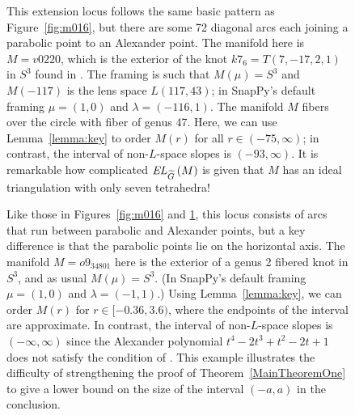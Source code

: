 \documentclass[tikz, sepfignums, defaultenums]{nmd/article}
\newcommand{\TEL}[1]{\mathit{EL}_\Gtil\left(#1\right)}
\begin{document}
\begin{figure}
  \begin{center}
  \end{center}

  \caption{ This extension locus follows the same basic pattern as
    Figure~\ref{fig:m016}, but there are some 72 diagonal arcs each
    joining a parabolic point to an Alexander point.  The manifold
    here is $M = v0220$, which is the exterior of the knot
    $k7_6 = T(7,-17,2,1)$ in $S^3$ found in
    \cite{ChampanerkarKofmanPatterson2004}.  The framing is such that
    $M(\mu) = S^3$ and $M(-117)$ is the lens space $L(117, 43)$; in
    SnapPy's default framing $\mu = (1,0)$ and $\lambda = (-116, 1)$.
    The manifold $M$ fibers over the circle with fiber of genus 47.
    Here, we can use Lemma~\ref{lemma:key} to order $M(r)$ for all
    $r \in (-75, \infty)$; in contrast, the interval of non-$L$-space
    slopes is $(-93, \infty)$.  It is remarkable how complicated
    $\TEL{M}$ is given that $M$ has an ideal triangulation with only
    seven tetrahedra!}
  \label{fig:v0220}
\end{figure}


\begin{figure}
  \begin{center}
  \end{center}

  \caption{Like those in Figures~\ref{fig:m016} and \ref{fig:v0220},
    this locus consists of arcs that run between parabolic and
    Alexander points, but a key difference is that the parabolic
    points lie on the horizontal axis.  The manifold $M = o9_{34801}$
    here is the exterior of a genus 2 fibered knot in $S^3$, and as
    usual $M(\mu) = S^3$.  (In SnapPy's default framing $\mu = (1,0)$
    and $\lambda = (-1, 1)$.)  Using Lemma~\ref{lemma:key}, we can
    order $M(r)$ for $r \in [-0.36, 3.6)$, where the endpoints of the
    interval are approximate.  In contrast, the interval of
    non-$L$-space slopes is $(-\infty, \infty)$ since the Alexander
    polynomial $t^4 - 2 t^3 + t^2 - 2 t + 1$ does not satisfy the
    condition of \cite[Corollary~1.3]{OSLensSpace2005}. This example
    illustrates the difficulty of strengthening the proof of
    Theorem~\ref{MainTheoremOne} to give a lower bound on the size of
    the interval $(-a, a)$ in the conclusion.}
  \label{fig:o9_34801}
\end{figure}
\end{document}
